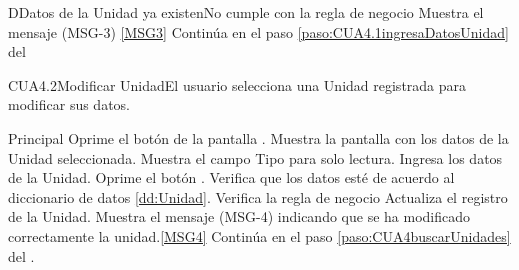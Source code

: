 	\begin{UCtrayectoriaA}{D}{Datos de la Unidad ya existen}{No cumple con la regla de negocio}
			\UCpaso Muestra el mensaje (MSG-3) \ref{MSG3}	
			\UCpaso Continúa en el paso \ref{paso:CUA4.1ingresaDatosUnidad} del 
	\end{UCtrayectoriaA}	






	\begin{UseCase}{CUA4.2}{Modificar Unidad}{El usuario selecciona una Unidad registrada para modificar sus datos.}
	\end{UseCase}

	\begin{UCtrayectoria}{Principal}
			\UCpaso[\UCactor] Oprime el botón  de la pantalla .
			\UCpaso Muestra la pantalla  con los datos de la Unidad seleccionada.
			\UCpaso Muestra el campo Tipo para solo lectura.
			\UCpaso [\UCactor] Ingresa los datos de la Unidad.\label{paso:CUA4.2ingresaDatosUnidad}
			\UCpaso [\UCactor] Oprime el botón .
			\UCpaso Verifica que los datos esté de acuerdo al diccionario de datos \ref{dd:Unidad}.  
			\UCpaso Verifica la regla de negocio 
			\UCpaso Actualiza el registro de la Unidad.
			\UCpaso Muestra el mensaje (MSG-4) indicando que se ha modificado correctamente la unidad.\ref{MSG4}
			\UCpaso Continúa en el paso \ref{paso:CUA4buscarUnidades} del .
	\end{UCtrayectoria}

